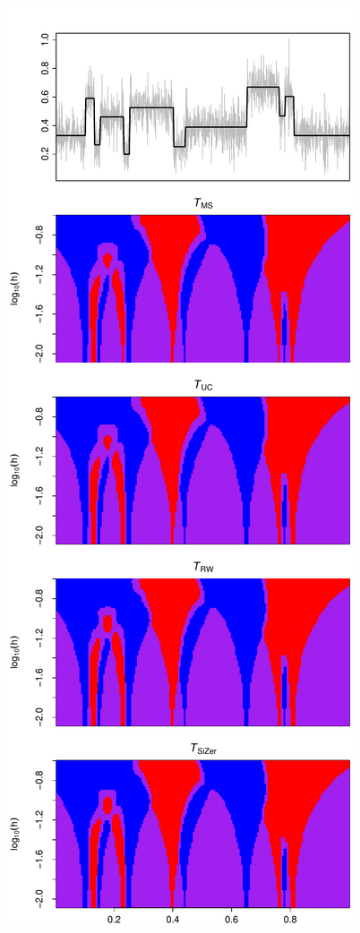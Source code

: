 \begin{figure}[p]
\begin{subfigure}[b]{0.475\textwidth}
\includegraphics[width=\textwidth]{Plots/SiZermaps/SiZer_map_T_1000_blocks_a1_-50_seed_1.pdf}

\end{subfigure}
\end{figure}
